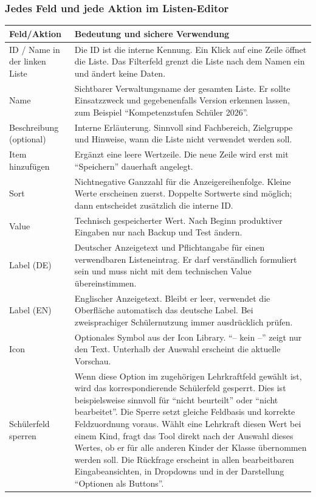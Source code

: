 \documentclass[12pt,a4paper]{article}
\begin{document}
\subsubsection*{Jedes Feld und jede Aktion im Listen-Editor}
\small
\begin{longtable}{|p{}|p{}|}
\hline
\textbf{Feld/Aktion} & \textbf{Bedeutung und sichere Verwendung}\\
\hline
ID / Name in der linken Liste & Die ID ist die interne Kennung. Ein Klick auf eine Zeile öffnet die Liste. Das Filterfeld grenzt die Liste nach dem Namen ein und ändert keine Daten.\\
\hline
Name & Sichtbarer Verwaltungsname der gesamten Liste. Er sollte Einsatzzweck und gegebenenfalls Version erkennen lassen, zum Beispiel \enquote{Kompetenzstufen Schüler 2026}.\\
\hline
Beschreibung (optional) & Interne Erläuterung. Sinnvoll sind Fachbereich, Zielgruppe und Hinweise, wann die Liste nicht verwendet werden soll.\\
\hline
Item hinzufügen & Ergänzt eine leere Wertzeile. Die neue Zeile wird erst mit \enquote{Speichern} dauerhaft angelegt.\\
\hline
Sort & Nichtnegative Ganzzahl für die Anzeigereihenfolge. Kleine Werte erscheinen zuerst. Doppelte Sortwerte sind möglich; dann entscheidet zusätzlich die interne ID.\\
\hline
Value & Technisch gespeicherter Wert. Nach Beginn produktiver Eingaben nur nach Backup und Test ändern.\\
\hline
Label (DE) & Deutscher Anzeigetext und Pflichtangabe für einen verwendbaren Listeneintrag. Er darf verständlich formuliert sein und muss nicht mit dem technischen Value übereinstimmen.\\
\hline
Label (EN) & Englischer Anzeigetext. Bleibt er leer, verwendet die Oberfläche automatisch das deutsche Label. Bei zweisprachiger Schülernutzung immer ausdrücklich prüfen.\\
\hline
Icon & Optionales Symbol aus der Icon Library. \enquote{-- kein --} zeigt nur den Text. Unterhalb der Auswahl erscheint die aktuelle Vorschau.\\
\hline
Schülerfeld sperren & Wenn diese Option im zugehörigen Lehrkraftfeld gewählt ist, wird das korrespondierende Schülerfeld gesperrt. Dies ist beispielsweise sinnvoll für \enquote{nicht beurteilt} oder \enquote{nicht bearbeitet}. Die Sperre setzt gleiche Feldbasis und korrekte Feldzuordnung voraus. Wählt eine Lehrkraft diesen Wert bei einem Kind, fragt das Tool direkt nach der Auswahl dieses Wertes, ob er für alle anderen Kinder der Klasse übernommen werden soll. Die Rückfrage erscheint in allen bearbeitbaren Eingabeansichten, in Dropdowns und in der Darstellung \enquote{Optionen als Buttons}.\\

\end{longtable}
\end{document}
